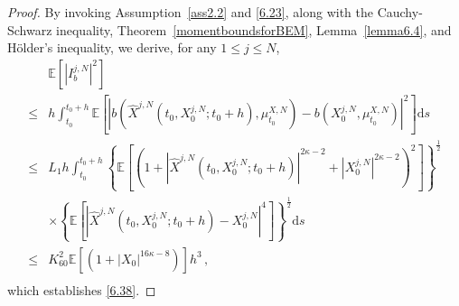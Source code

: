 \documentclass[12pt]{article}
\numberwithin{equation}{section}
\begin{document}
\begin{proof} 
By invoking Assumption~\ref{ass2.2} and \eqref{6.23}, along with the Cauchy-Schwarz inequality, Theorem~\ref{momentboundsforBEM}, Lemma~\ref{lemma6.4}, and H\"older's inequality, we derive, for any $1 \leq j \leq N$,
\begin{equation}\tag{5.137}\label{6.40}
\begin{aligned}
	&\mathbb{E} \left[ \left| I_{b}^{j,N} \right|^2 \right]\\
	\le& h\int_{t_0}^{t_0+h}{\mathbb{E} \left[ \left| b\left( \hat{X}^{j,N}\left( t_0,X^{j,N}_0;t_0+h \right) ,\mu _{t_0}^{X,N} \right) -b\left( X^{j,N}_0,\mu _{t_0}^{X,N} \right) \right|^2 \right]}\mathrm{d}s\\
	\le& L_1h\int_{t_0}^{t_0+h}{\left\{ \mathbb{E} \left[ \left( 1+\left|\hat{X}^{j,N}\left( t_0,X^{j,N}_0;t_0+h \right) \right|^{2\kappa -2}+\left|X^{j,N}_0\right|^{2\kappa -2} \right) ^{2} \right] \right\} ^{\frac{1}{2}}}\\
	&\times \left\{ \mathbb{E} \left[ \left|\hat{X}^{j,N}\left( t_0,X^{j,N}_0;t_0+h \right) -X^{j,N}_0\right|^{4} \right] \right\} ^{\frac{1}{2}}\mathrm{d}s\\
	\le& K_{60}^{2}\mathbb{E} \left[ \left(1+\left|X_0\right|^{16\kappa -8}\right) \right] h^3\,, \\
\end{aligned}
\end{equation}
which establishes \eqref{6.38}.


\end{proof}
\end{document}
